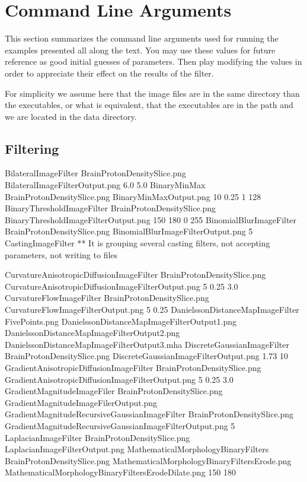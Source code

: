 \section{Command Line Arguments}

This section summarizes the command line arguments used for running the
examples presented all along the text. You may use these values for future
reference as good initial guesses of parameters. Then play modifying the values
in order to appreciate their effect on the results of the filter.

For simplicity we assume here that the image files are in the same directory
than the executables, or what is equivalent, that the executables are in the
path and we are located in the data directory.

\subsection{Filtering}

BilateralImageFilter             BrainProtonDensitySlice.png  BilateralImageFilterOutput.png        6.0    5.0
BinaryMinMax                     BrainProtonDensitySlice.png  BinaryMinMaxOutput.png                10      0.25  1  128
BinaryThresholdImageFilter       BrainProtonDensitySlice.png  BinaryThresholdImageFilterOutput.png  150 180 0 255
BinomialBlurImageFilter          BrainProtonDensitySlice.png  BinomialBlurImageFilterOutput.png     5
CastingImageFilter               ** It is grouping several casting filters, not accepting parameters, not writing to files

CurvatureAnisotropicDiffusionImageFilter  BrainProtonDensitySlice.png  CurvatureAnisotropicDiffusionImageFilterOutput.png  5  0.25  3.0
CurvatureFlowImageFilter         BrainProtonDensitySlice.png  CurvatureFlowImageFilterOutput.png   5  0.25
DanielssonDistanceMapImageFilter FivePoints.png DanielssonDistanceMapImageFilterOutput1.png DanielssonDistanceMapImageFilterOutput2.png DanielssonDistanceMapImageFilterOutput3.mha
DiscreteGaussianImageFilter      BrainProtonDensitySlice.png  DiscreteGaussianImageFilterOutput.png  1.73  10
GradientAnisotropicDiffusionImageFilter  BrainProtonDensitySlice.png GradientAnisotropicDiffusionImageFilterOutput.png   5    0.25   3.0
GradientMagnitudeImageFiler      BrainProtonDensitySlice.png  GradientMagnitudeImageFilerOutput.png
GradientMagnitudeRecursiveGaussianImageFilter  BrainProtonDensitySlice.png GradientMagnitudeRecursiveGaussianImageFilterOutput.png  5
LaplacianImageFilter             BrainProtonDensitySlice.png  LaplacianImageFilterOutput.png
MathematicalMorphologyBinaryFilters BrainProtonDensitySlice.png MathematicalMorphologyBinaryFiltersErode.png MathematicalMorphologyBinaryFiltersErodeDilate.png 150 180


